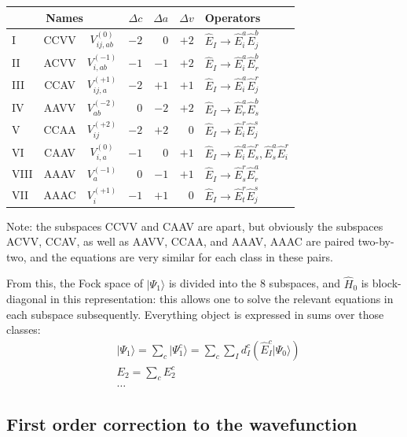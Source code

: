 \documentclass{article}
\newcommand  \equ[2]       {\begin{align}#2\label{#1}\end{align}}
\newcommand  \ket[1]       {\vert #1  \rangle}
\begin{document}
\begin{center}
\begin{tabular}{lcc|rrr|l}
  \hline\hline
  \multicolumn{3}{c|}{Names}              & $\Delta c$
                                                   & $\Delta a$
                                                        & $\Delta v$
                                                               & Operators\\
  \hline
  I    & CCVV & $V_{ij,ab }^{(0)}$  & $-2$ & $ 0$ & $+2$ & $\hat{E}_I \rightarrow \hat{E}_i^a\hat{E}_j^b$ \\
  II   & ACVV & $V_{i,ab}  ^{(-1)}$ & $-1$ & $-1$ & $+2$ & $\hat{E}_I \rightarrow \hat{E}_i^a\hat{E}_r^b$ \\
  III  & CCAV & $V_{ij,a}  ^{(+1)}$ & $-2$ & $+1$ & $+1$ & $\hat{E}_I \rightarrow \hat{E}_i^a\hat{E}_j^r$ \\
  IV   & AAVV & $V_{ab}    ^{(-2)}$ & $ 0$ & $-2$ & $+2$ & $\hat{E}_I \rightarrow \hat{E}_r^a\hat{E}_s^b$ \\
  V    & CCAA & $V_{ij}    ^{(+2)}$ & $-2$ & $+2$ & $ 0$ & $\hat{E}_I \rightarrow \hat{E}_i^r\hat{E}_j^s$ \\
  VI   & CAAV & $V_{i,a}   ^{(0)}$  & $-1$ & $ 0$ & $+1$ & $\hat{E}_I \rightarrow \hat{E}_i^a\hat{E}_s^r, \hat{E}_s^a\hat{E}_i^r$ \\
  VIII & AAAV & $V_{a}     ^{(-1)}$ & $ 0$ & $-1$ & $+1$ & $\hat{E}_I \rightarrow \hat{E}_s^r\hat{E}_r^a$ \\
  VII  & AAAC & $V_{i}     ^{(+1)}$ & $-1$ & $+1$ & $ 0$ & $\hat{E}_I \rightarrow \hat{E}_t^r\hat{E}_j^s$ \\
  \hline\hline
\end{tabular}
\end{center}
Note: the subspaces CCVV and CAAV are apart, but obviously the subspaces ACVV, CCAV,
as well as AAVV, CCAA, and AAAV, AAAC are paired two-by-two,
and the equations are very similar for each class in these pairs.

From this, the Fock space of $\ket{\Psi_1}$ is divided into the 8 subspaces,
and $\hat{H}_0$ is block-diagonal in this representation:
this allows one to solve the relevant equations in each subspace subsequently.
Everything object is expressed in sums over those classes:
\equ{}{
   & \ket{\Psi_1}=\sum_c\ket{\Psi_1^c}=\sum_c\sum_I d_I^c\left(\hat{E}_I^c\ket{\Psi_0}\right)
 \\& E_2=\sum_c E_2^c
 \\& \dots\nonumber
}

\subsection{First order correction to the wavefunction}
\end{document}
